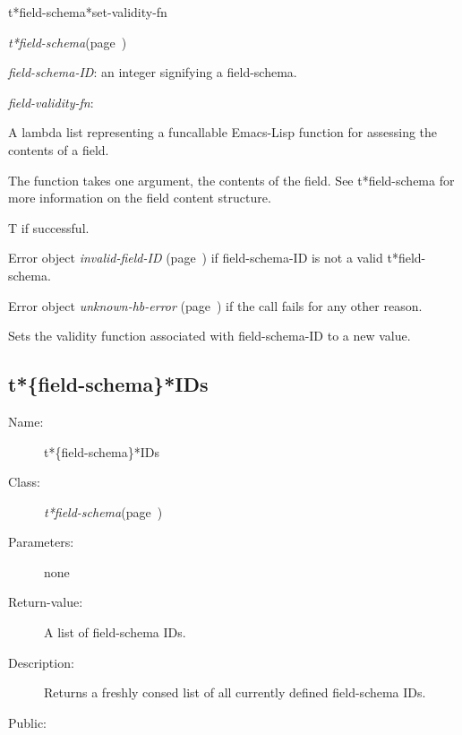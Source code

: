 \begin{description}
\item [Name:]  t*field-schema*set-validity-fn

\item [Class:] {\sl t*field-schema}\hfill(page~\pageref{t*field-schema})

\item [Parameters:]
\item {\sl field-schema-ID}:  an integer signifying a field-schema.

\item {\sl field-validity-fn}:  

A lambda list representing a funcallable Emacs-Lisp function for
assessing the contents of a field.

The function takes one argument, the contents of the field.
See t*field-schema for more information on the field content
structure.




\item [Return-value:] 
T if successful.

Error object {\sl invalid-field-ID} (page~\pageref{invalid-field-ID}) if field-schema-ID is not a valid t*field-schema.

Error object {\sl unknown-hb-error} (page~\pageref{unknown-hb-error}) if the call fails
for any other reason. 

\item [Description:]

Sets the validity function associated with field-schema-ID
to a new value. 


\item [Public:]



\end{description}
\horizontalline

\subsection{t*\{field-schema\}*IDs}
\label{t*field-schema*IDs}

\begin{description}
\item [Name:]  t*\{field-schema\}*IDs

\item [Class:] {\sl t*field-schema}\hfill(page~\pageref{t*field-schema})

\item [Parameters:] none

\item [Return-value:] A list of field-schema IDs.

\item [Description:]

Returns a freshly consed list of all currently defined
field-schema IDs.

\item [Public:]



\end{description}
\horizontalline

